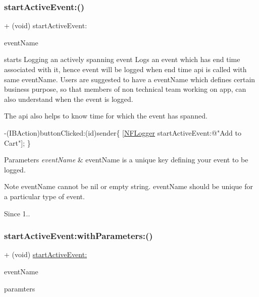 \subsubsection{\texorpdfstring{start\+Active\+Event\+:()}{startActiveEvent:()}}
{\footnotesize\ttfamily + (void) start\+Active\+Event\+: \begin{DoxyParamCaption}\item[{(N\+S\+String $\ast$)}]{event\+Name }\end{DoxyParamCaption}}



starts Logging an actively spanning event Logs an event which has end time associated with it, hence event will be logged when end time api is called with same event\+Name. Users are suggested to have a event\+Name which defines certain business purpose, so that members of non technical team working on app, can also understand when the event is logged. 

The api also helps to know time for which the event has spanned.


\begin{DoxyCode}
-(IBAction)buttonClicked:(\textcolor{keywordtype}{id})sender\{
 [\hyperlink{interface_n_f_logger}{NFLogger} startActiveEvent:\textcolor{stringliteral}{@"Add to Cart"}];
\}
\end{DoxyCode}
 
\begin{DoxyParams}{Parameters}
{\em event\+Name} & event\+Name is a unique key defining your event to be logged. \\
\hline
\end{DoxyParams}
\begin{DoxyNote}{Note}
event\+Name cannot be nil or empty string. event\+Name should be unique for a particular type of event. 
\end{DoxyNote}
\begin{DoxySince}{Since}
1.. 
\end{DoxySince}
\mbox{\label{interface_n_f_logger_a415def4182d5d458ff013bacb1320857}} 
\subsubsection{\texorpdfstring{start\+Active\+Event\+:with\+Parameters\+:()}{startActiveEvent:withParameters:()}}
{\footnotesize\ttfamily + (void) \hyperlink{interface_n_f_logger_a2d98749d91d892500fab101747d06a71}{start\+Active\+Event\+:} \begin{DoxyParamCaption}\item[{(N\+S\+String $\ast$)}]{event\+Name }\item[{withParameters:(N\+S\+Dictionary $\ast$)}]{paramters }\end{DoxyParamCaption}}



